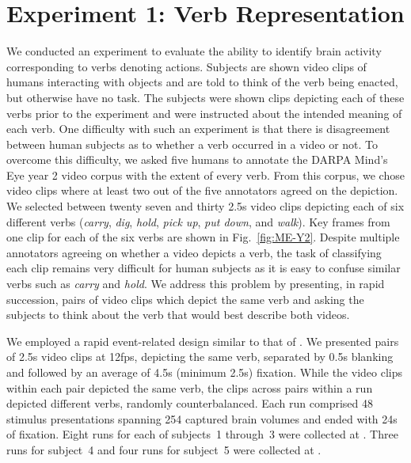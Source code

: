 \section{Experiment 1: Verb Representation}
\label{sec:experiment1}

We conducted an experiment to evaluate the ability to identify brain activity
corresponding to verbs denoting actions.
%
Subjects are shown video clips of humans interacting with objects and are told
to think of the verb being enacted, but otherwise have no task.
%
The subjects were shown clips depicting each of these verbs prior to the
experiment and were instructed about the intended meaning of each verb.
%
One difficulty with such an experiment is that there is disagreement between
human subjects as to whether a verb occurred in a video or not.
%
To overcome this difficulty, we asked five humans to annotate the
DARPA Mind's Eye year 2 video corpus with the extent of every verb.
%
From this corpus, we chose video clips where at least two out of the five
annotators agreed on the depiction.
%
We selected between twenty seven and thirty 2.5s video clips depicting each of
six different verbs (\emph{carry}, \emph{dig}, \emph{hold}, \emph{pick up},
\emph{put down}, and \emph{walk}).
%
Key frames from one clip for each of the six verbs are shown in
Fig.~\ref{fig:ME-Y2}.
%
Despite multiple annotators agreeing on whether a video depicts a verb,
the task of classifying each clip remains very difficult for human subjects
as it is easy to confuse similar verbs such as \emph{carry} and \emph{hold}.
%
We address this problem by presenting, in rapid succession, pairs of video
clips which depict the same verb and asking the subjects to think about the
verb that would best describe both videos.

We employed a rapid event-related design similar to that of \citet{just2010}.
%
We presented pairs of 2.5s video clips at 12fps, depicting the same
verb, separated by 0.5s blanking and followed by an average of 4.5s (minimum
2.5s) fixation.
%
While the video clips within each pair depicted the same verb, the clips across
pairs within a run depicted different verbs, randomly counterbalanced.
%
Each run comprised 48 stimulus presentations spanning 254 captured brain volumes
and ended with 24s of fixation.
%
Eight runs for each of subjects~1 through~3 were collected at \Purdue.
%
Three runs for subject~4 and four runs for subject~5 were collected at
\StJames.


